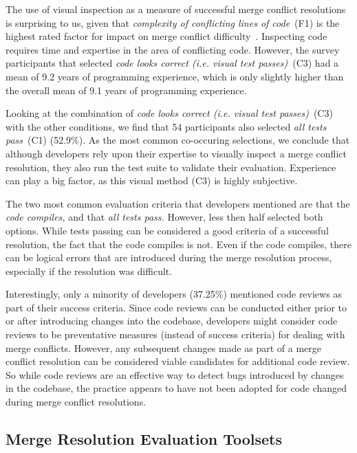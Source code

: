 The use of visual inspection as a measure of successful merge conflict resolutions is surprising to us, given that \textit{complexity of conflicting lines of code}~(F1) is the highest rated factor for impact on merge conflict difficulty~\cite{mckee2017software}.
Inspecting code requires time and expertise in the area of conflicting code.
However, the survey participants that selected \textit{code looks correct (i.e. visual test passes)}~(C3) had a mean of 9.2 years of programming experience, which is only slightly higher than the overall mean of 9.1 years of programming experience.

Looking at the combination of \textit{code looks correct (i.e. visual test passes)}~(C3) with the other conditions, we find that 54 participants also selected \textit{all tests pass}~(C1) (52.9\%).
As the most common co-occuring selections, we conclude that although developers rely upon their expertise to visually inspect a merge conflict resolution, they also run the test suite to validate their evaluation.
Experience can play a big factor, as this visual method (C3) is highly subjective.

The two most common evaluation criteria that developers mentioned are that the \emph{code compiles,} and that \emph{all tests pass.}
However, less then half selected both options.
While tests passing can be considered a good criteria of a successful resolution, the fact that the code compiles is not.
Even if the code compiles, there can be logical errors that are introduced during the merge resolution process, especially if the resolution was difficult.

Interestingly, only a minority of developers (37.25\%) mentioned code reviews as part of their success criteria.
Since code reviews can be conducted either prior to or after introducing changes into the codebase, developers might consider code reviews to be preventative measures (instead of success criteria) for dealing with merge conflicts.
However, any subsequent changes made as part of a merge conflict resolution can be considered viable candidates for additional code review.
So while code reviews are an effective way to detect bugs introduced by changes in the codebase, the practice appears to have not been adopted for code changed during merge conflict resolutions.

\subsection{Merge Resolution Evaluation Toolsets}

